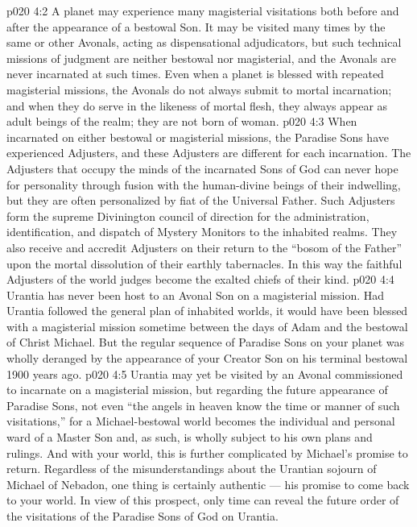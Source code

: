 \vs p020 4:2 A planet may experience many magisterial visitations both before and after the appearance of a bestowal Son. It may be visited many times by the same or other Avonals, acting as dispensational adjudicators, but such technical missions of judgment are neither bestowal nor magisterial, and the Avonals are never incarnated at such times. Even when a planet is blessed with repeated magisterial missions, the Avonals do not always submit to mortal incarnation; and when they do serve in the likeness of mortal flesh, they always appear as adult beings of the realm; they are not born of woman.
\vs p020 4:3 When incarnated on either bestowal or magisterial missions, the Paradise Sons have experienced Adjusters, and these Adjusters are different for each incarnation. The Adjusters that occupy the minds of the incarnated Sons of God can never hope for personality through fusion with the human\hyp{}divine beings of their indwelling, but they are often personalized by fiat of the Universal Father. Such Adjusters form the supreme Divinington council of direction for the administration, identification, and dispatch of Mystery Monitors to the inhabited realms. They also receive and accredit Adjusters on their return to the “bosom of the Father” upon the mortal dissolution of their earthly tabernacles. In this way the faithful Adjusters of the world judges become the exalted chiefs of their kind.
\vs p020 4:4 \pc Urantia has never been host to an Avonal Son on a magisterial mission. Had Urantia followed the general plan of inhabited worlds, it would have been blessed with a magisterial mission sometime between the days of Adam and the bestowal of Christ Michael. But the regular sequence of Paradise Sons on your planet was wholly deranged by the appearance of your Creator Son on his terminal bestowal 1900 years ago.
\vs p020 4:5 Urantia may yet be visited by an Avonal commissioned to incarnate on a magisterial mission, but regarding the future appearance of Paradise Sons, not even “the angels in heaven know the time or manner of such visitations,” for a Michael\hyp{}bestowal world becomes the individual and personal ward of a Master Son and, as such, is wholly subject to his own plans and rulings. And with your world, this is further complicated by Michael’s promise to return. Regardless of the misunderstandings about the Urantian sojourn of Michael of Nebadon, one thing is certainly authentic --- his promise to come back to your world. In view of this prospect, only time can reveal the future order of the visitations of the Paradise Sons of God on Urantia.
